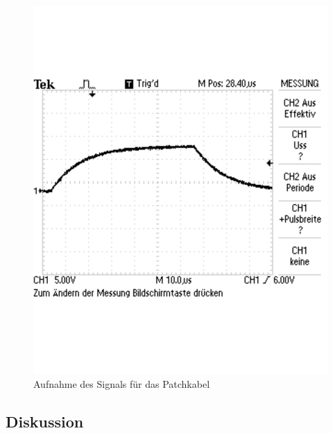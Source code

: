 \documentclass[12pt,a4paper]{article}
\begin{document}
\begin{figure}[H] 
  \centering
    \includegraphics[scale = 0.5]{5_2.pdf}
  	\caption[Aufnahme des Signals für das Patchkabel]{Aufnahme des Signals für das Patchkabel}
  \label{fig:5_2}
\end{figure}


\subsection{Diskussion}
\end{document}
